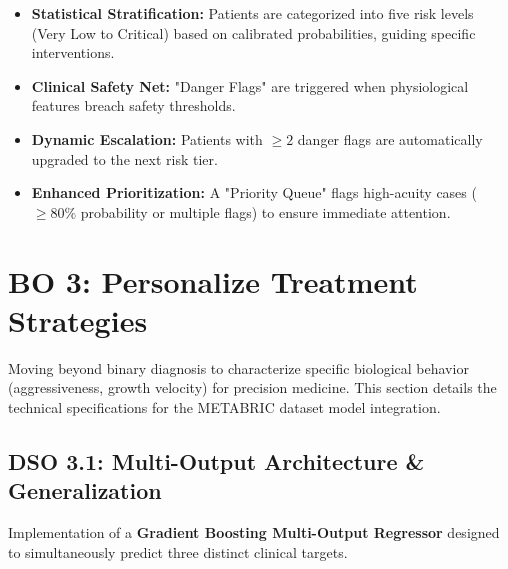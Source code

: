 \begin{itemize}
    \item \textbf{Statistical Stratification:} Patients are categorized into five risk levels (Very Low to Critical) based on calibrated probabilities, guiding specific interventions.
    \item \textbf{Clinical Safety Net:} "Danger Flags" are triggered when physiological features breach safety thresholds.
    \item \textbf{Dynamic Escalation:} Patients with $\ge 2$ danger flags are automatically upgraded to the next risk tier.
    \item \textbf{Enhanced Prioritization:} A "Priority Queue" flags high-acuity cases ($\ge 80\%$ probability or multiple flags) to ensure immediate attention.
\end{itemize}

\section{BO 3: Personalize Treatment Strategies}

\begin{infobox}[title=Context]
Moving beyond binary diagnosis to characterize specific biological behavior (aggressiveness, growth velocity) for precision medicine. This section details the technical specifications for the METABRIC dataset model integration.
\end{infobox}

\subsection{DSO 3.1: Multi-Output Architecture \& Generalization}
Implementation of a \textbf{Gradient Boosting Multi-Output Regressor} designed to simultaneously predict three distinct clinical targets.

